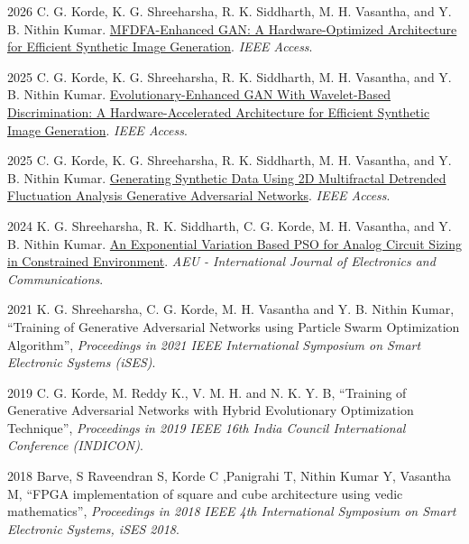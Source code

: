 \documentclass[fontsize=11pt]{tccv}
\begin{document}
\begin{publi}
\item{2026} {C. G. Korde, K. G. Shreeharsha, R. K. Siddharth, M. H. Vasantha, and Y. B. Nithin Kumar. \href{https://doi.org/10.1109/ACCESS.2026.3677066}{MFDFA-Enhanced GAN: A Hardware-Optimized Architecture for Efficient Synthetic Image Generation}. \textit{IEEE Access}.}
\vspace{1em}
\item{2025} {C. G. Korde, K. G. Shreeharsha, R. K. Siddharth, M. H. Vasantha, and Y. B. Nithin Kumar. \href{https://doi.org/10.1109/ACCESS.2025.3642041}{Evolutionary-Enhanced GAN With Wavelet-Based Discrimination: A Hardware-Accelerated Architecture for Efficient Synthetic Image Generation}. \textit{IEEE Access}.}
\vspace{1em}
\item{2025} {C. G. Korde, K. G. Shreeharsha, R. K. Siddharth, M. H. Vasantha, and Y. B. Nithin Kumar. \href{https://doi.org/10.1109/ACCESS.2025.3603332}{Generating Synthetic Data Using 2D Multifractal Detrended Fluctuation Analysis Generative Adversarial Networks}. \textit{IEEE Access}.}
\vspace{1em}
\item{2024} {K. G. Shreeharsha, R. K. Siddharth, C. G. Korde, M. H. Vasantha, and Y. B. Nithin Kumar. \href{https://doi.org/10.1016/j.aeue.2024.155531}{An Exponential Variation Based PSO for Analog Circuit Sizing in Constrained Environment}. \textit{AEU - International Journal of Electronics and Communications}.}
\vspace{1em}
\item{2021} {K. G. Shreeharsha, C. G. Korde, M. H. Vasantha and Y. B. Nithin Kumar, \textquotedblleft Training of Generative Adversarial Networks using Particle Swarm Optimization Algorithm\textquotedblright, \textit{Proceedings in 2021 IEEE International Symposium on Smart Electronic Systems (iSES)}.\qquad }
\vspace{1em}

\item{2019} {C. G. Korde, M. Reddy K., V. M. H. and N. K. Y. B, \textquotedblleft Training of Generative Adversarial Networks with Hybrid Evolutionary Optimization Technique\textquotedblright, \textit{Proceedings in 2019 IEEE 16th India Council International Conference (INDICON)}.\qquad }
\item{2018} {Barve, S Raveendran S, Korde C ,Panigrahi T, Nithin Kumar Y, Vasantha M,  \textquotedblleft FPGA implementation of square and cube architecture using vedic mathematics\textquotedblright, \textit{Proceedings in 2018 IEEE 4th International Symposium on Smart Electronic Systems, iSES 2018}.\qquad }
\vspace{1em}


\end{publi}
\end{document}
